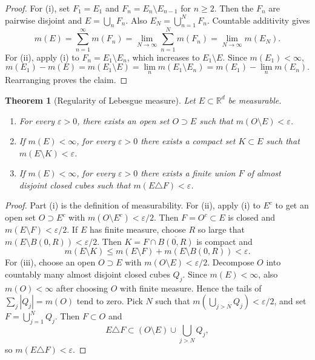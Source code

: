 \documentclass[11pt,openany]{book}
\numberwithin{equation}{chapter}
\theoremstyle{definition}
\theoremstyle{plain}
\newtheorem{theorem}[definition]{Theorem}
\theoremstyle{remark}
\newcommand{\R}{\mathbb{R}}
\newcommand{\eps}{\varepsilon}
\newcommand{\1}{\mathbf{1}}
\newcommand{\abs}[1]{\left\lvert #1\right\rvert}
\begin{document}
\begin{proof}
For (i), set \(F_1=E_1\) and \(F_n=E_n\setminus E_{n-1}\) for \(n\ge2\).  Then the \(F_n\) are pairwise disjoint and \(E=\bigcup_nF_n\).  Also \(E_N=\bigcup_{n=1}^N F_n\).  Countable additivity gives
\[
    m(E)=\sum_{n=1}^\infty m(F_n)=\lim_{N\to\infty}\sum_{n=1}^Nm(F_n)=\lim_{N\to\infty}m(E_N).
\]
For (ii), apply (i) to \(F_n=E_1\setminus E_n\), which increases to \(E_1\setminus E\).  Since \(m(E_1)<\infty\),
\[
    m(E_1)-m(E)=m(E_1\setminus E)=\lim_n m(E_1\setminus E_n)=m(E_1)-\lim_n m(E_n).
\]
Rearranging proves the claim.
\end{proof}

\begin{theorem}[Regularity of Lebesgue measure]
Let \(E\subset\R^d\) be measurable.
\begin{enumerate}[label=(\roman*)]
    \item For every \(\eps>0\), there exists an open set \(O\supset E\) such that \(m(O\setminus E)<\eps\).
    \item If \(m(E)<\infty\), for every \(\eps>0\) there exists a compact set \(K\subset E\) such that \(m(E\setminus K)<\eps\).
    \item If \(m(E)<\infty\), for every \(\eps>0\) there exists a finite union \(F\) of almost disjoint closed cubes such that \(m(E\triangle F)<\eps\).
\end{enumerate}
\end{theorem}

\begin{proof}
Part (i) is the definition of measurability.  For (ii), apply (i) to \(E^c\) to get an open set \(O\supset E^c\) with \(m(O\setminus E^c)<\eps/2\).  Then \(F=O^c\subset E\) is closed and \(m(E\setminus F)<\eps/2\).  If \(E\) has finite measure, choose \(R\) so large that \(m(E\setminus B(0,R))<\eps/2\).  Then \(K=F\cap \overline{B(0,R)}\) is compact and
\[
    m(E\setminus K)\le m(E\setminus F)+m(E\setminus B(0,R))<\eps.
\]
For (iii), choose an open \(O\supset E\) with \(m(O\setminus E)<\eps/2\).  Decompose \(O\) into countably many almost disjoint closed cubes \(Q_j\).  Since \(m(E)<\infty\), also \(m(O)<\infty\) after choosing \(O\) with finite measure.  Hence the tails of \(\sum_j\abs{Q_j}=m(O)\) tend to zero.  Pick \(N\) such that \(m(\bigcup_{j>N}Q_j)<\eps/2\), and set \(F=\bigcup_{j=1}^NQ_j\).  Then \(F\subset O\) and
\[
    E\triangle F\subset (O\setminus E)\cup\bigcup_{j>N}Q_j,
\]
so \(m(E\triangle F)<\eps\).
\end{proof}
\end{document}
